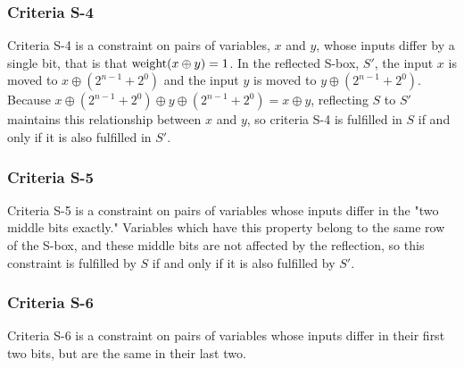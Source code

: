 \subsubsection{Criteria S-4}

Criteria S-4 is a constraint on pairs of variables, $x$ and $y$, 
whose inputs differ by a single bit,
that is that $\operatorname{weight}(x \oplus y) = 1$.
In the reflected S-box, $S'$, the input
$x$ is moved to $x \oplus (2^{n-1} + 2^0)$ and
the input $y$ is moved to 
$y \oplus (2^{n-1} + 2^0)$.
Because 
$x \oplus (2^{n-1} + 2^0) \oplus y \oplus (2^{n-1} + 2^0) = x \oplus y$,
reflecting $S$ to $S'$ maintains this relationship between $x$ and $y$,
so criteria S-4 is fulfilled in $S$ if and only if it is also fulfilled in $S'$.
%

\subsubsection{Criteria S-5}
Criteria S-5 is a constraint on pairs of variables whose inputs differ in the "two middle bits exactly." 
Variables which have this property belong to the same row of the S-box, and these middle bits are not 
affected by the reflection, so this constraint is fulfilled by $S$ if and only if it is also fulfilled by $S'$.

\subsubsection{Criteria S-6}
Criteria S-6 is a constraint on pairs of variables whose inputs differ in their first two bits,
but are the same in their last two.

